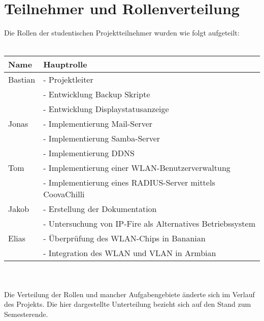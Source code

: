 \chapter{Teilnehmer und Rollenverteilung}
Die Rollen der studentischen Projektteilnehmer wurden wie folgt aufgeteilt:\\\\
\begin{tabular}{l l}
Name & Hauptrolle \\
\hline
Bastian & - Projektleiter\\
	& - Entwicklung Backup Skripte\\
	& - Entwicklung Displaystatusanzeige\\
\hline
Jonas	& - Implementierung Mail-Server\\
	& - Implementierung Samba-Server\\
	& - Implementierung DDNS\\
\hline
Tom	& - Implementierung einer WLAN-Benutzerverwaltung\\
	& - Implementierung eines RADIUS-Server mittels CoovaChilli\\
\hline
Jakob	& - Erstellung der Dokumentation\\
	& - Untersuchung von IP-Fire als Alternatives Betriebssystem\\
\hline
Elias	& - Überprüfung des WLAN-Chips in Bananian\\
	& - Integration des WLAN und VLAN in Armbian\\
\end{tabular}
~\\~\\
Die Verteilung der Rollen und mancher Aufgabengebiete änderte sich im Verlauf des Projekts. Die hier dargestellte Unterteilung bezieht sich auf den Stand zum Semesterende.

